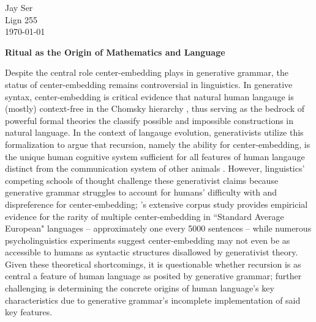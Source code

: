 \documentclass[12pt, letterpaper]{article}
\newcommand{\myName}{Jay Ser}
\newcommand{\myClass}{Lign 255}
\newcommand{\myDate}{\today}
\newcommand{\reportTitle}{Ritual as the Origin of Mathematics and Language}
\begin{document}
\thispagestyle{firstpage}

\begin{flushright}
    \myName \\
    \myClass \\
    \myDate
\end{flushright}

\vspace{2cm}

\begin{center}
    {\LARGE \textbf{\reportTitle}}
\end{center}

\vspace{1cm}

\onehalfspacing

Despite the central role center-embedding plays in generative grammar, the status of center-embedding remains controversial in linguistics. 
In generative syntax, center-embedding is critical evidence that natural human langauge is (mostly) context-free in the Chomsky hierarchy \parencite{hunter2021chomsky}, thus serving as the bedrock of powerful formal theories the classify possible and impossible constructions in natural language.  
In the context of langauge evolution, generativists utilize this formalization to argue that recursion, namely the ability for center-embedding, is the unique human cognitive system sufficient for all features of human langauge distinct from the communication system of other animals \parencite{hauser2002faculty}. 
However, linguistics' competing schools of thought challenge these generativist claims because generative grammar struggles to account for humans' difficulty with and dispreference for center-embedding; 
\cite{karlsson2007constraints}'s extensive corpus study provides empiricial evidence for the rarity of multiple center-embedding in ``Standard Average European" languages -- approximately one every 5000 sentences -- 
while numerous psycholinguistics experiments \parencite{ottl2015does, udden2012implicit, davis2023learnability, ferrigno2025humans} suggest center-embedding may not even be as accessible to humans as syntactic structures disallowed by generativist theory. 
Given these theoretical shortcomings, it is questionable whether recursion is as central a feature of human language as posited by generative grammar; 
further challenging is determining the concrete origins of human language's key characteristics due to generative grammar's incomplete implementation of said key features.  
\end{document}
